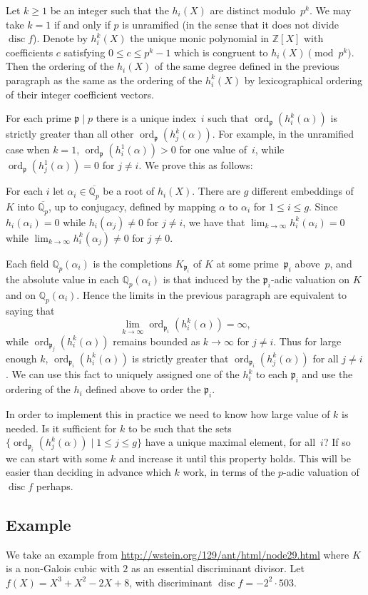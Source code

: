 \documentclass{article}
\def\Z{{\mathbb Z}}
\def\Q{{\mathbb Q}}
\def\p{{\mathfrak p}}
\def\Qpbar{\overline{\Q_p}}
\DeclareMathOperator{\disc}{disc}
\DeclareMathOperator{\ord}{ord}
\begin{document}
Let $k\ge1$ be an integer such that the $h_i(X)$ are distinct
modulo~$p^k$.  We may take $k=1$ if and only if $p$ is unramified (in
the sense that it does not divide $\disc f$).  Denote by $h_i^k(X)$
the unique monic polynomial in $\Z[X]$ with coefficients $c$
satisfying $0\le c\le p^k-1$ which is congruent to $h_i(X)\pmod{p^k}$.
Then the ordering of the $h_i(X)$ of the same degree defined in the
previous paragraph as the same as the ordering of the $h_i^k(X)$ by
lexicographical ordering of their integer coefficient vectors.

For each prime $\p\mid p$ there is a unique index~$i$ such that
$\ord_{\p}(h_i^k(\alpha))$ is strictly greater than all other
$\ord_{\p}(h_j^k(\alpha))$.  For example, in the unramified case when
$k=1$, $\ord_{\p}(h_i^1(\alpha))>0$ for one value of~$i$, while
$\ord_{\p}(h_j^1(\alpha))=0$ for $j\not=i$.  We prove this as follows:

For each $i$ let $\alpha_i\in\Qpbar$ be a root of $h_i(X)$.  There are
$g$ different embeddings of $K$ into $\Qpbar$, up to conjugacy,
defined by mapping $\alpha$ to $\alpha_i$ for $1\le i\le g$.  Since
$h_i(\alpha_i)=0$ while $h_i(\alpha_j)\not=0$ for $j\not=i$, we have
that $\lim_{k\to\infty}h_i^k(\alpha_i)=0$ while
$\lim_{k\to\infty}h_i^k(\alpha_j)\not=0$ for $j\not=0$.

Each field $\Q_p(\alpha_i)$ is the completions $K_{\p_i}$ of $K$ at
some prime~$\p_i$ above~$p$, and the absolute value in each
$\Q_p(\alpha_i)$ is that induced by the $\p_i$-adic valuation on $K$
and on $\Q_p(\alpha_i)$.  Hence the limits in the previous paragraph
are equivalent to saying that
\[
    \lim_{k\to\infty}\ord_{\p_i}(h_i^k(\alpha)) = \infty,
\]
while $\ord_{\p_j}(h_i^k(\alpha))$ remains bounded as $k\to\infty$ for
$j\not=i$.  Thus for large enough $k$, $\ord_{\p_i}(h_i^k(\alpha))$ is
strictly greater that $\ord_{\p_i}(h_j^k(\alpha))$ for all $j\not=i$.
We can use this fact to uniquely assigned one of the $h_i^k$ to each
$\p_i$ and use the ordering of the $h_i$ defined above to order the
$\p_i$.

In order to implement this in practice we need to know how large value
of $k$ is needed.  Is it sufficient for $k$ to be such that the sets
$\{\ord_{\p_i}(h_j^k(\alpha)) \mid 1\le j\le g\}$ have a unique
maximal element, for all~$i$?  If so we can start with some $k$ and
increase it until this property holds.  This will be easier than
deciding in advance which $k$ work, in terms of the $p$-adic valuation
of $\disc f$ perhaps.

\subsection{Example}
We take an example from
\url{http://wstein.org/129/ant/html/node29.html} where $K$ is a
non-Galois cubic with $2$ as an essential discriminant divisor.  Let
$f(X) = X^3+X^2-2X+8$, with discriminant $\disc f = -2^2\cdot503$.
\end{document}
